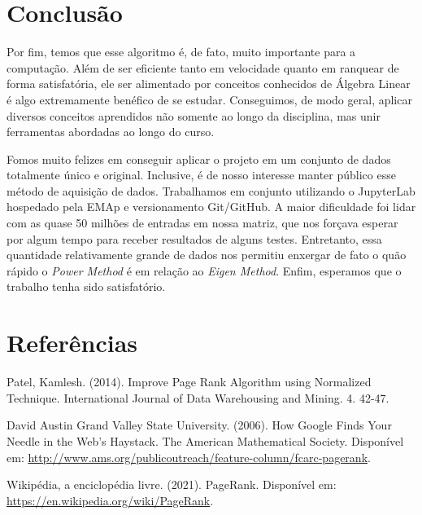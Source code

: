 \documentclass[11pt]{article}
\begin{document}
    \hypertarget{conclusuxe3o}{%
\section{Conclusão}\label{conclusuxe3o}}

Por fim, temos que esse algoritmo é, de fato, muito importante para a
computação. Além de ser eficiente tanto em velocidade quanto em ranquear
de forma satisfatória, ele ser alimentado por conceitos conhecidos de
Álgebra Linear é algo extremamente benéfico de se estudar. Conseguimos,
de modo geral, aplicar diversos conceitos aprendidos não somente ao
longo da disciplina, mas unir ferramentas abordadas ao longo do curso.

Fomos muito felizes em conseguir aplicar o projeto em um conjunto de
dados totalmente único e original. Inclusive, é de nosso interesse
manter público esse método de aquisição de dados. Trabalhamos em
conjunto utilizando o JupyterLab hospedado pela EMAp e versionamento
Git/GitHub. A maior dificuldade foi lidar com as quase 50 milhões de
entradas em nossa matriz, que nos forçava esperar por algum tempo para
receber resultados de alguns testes. Entretanto, essa quantidade
relativamente grande de dados nos permitiu enxergar de fato o quão
rápido o \emph{Power Method} é em relação ao \emph{Eigen Method}. Enfim,
esperamos que o trabalho tenha sido satisfatório.

\hypertarget{referuxeancias}{%
\section*{Referências}\label{referuxeancias}}

Patel, Kamlesh. (2014). Improve Page Rank Algorithm using Normalized
Technique. International Journal of Data Warehousing and Mining. 4.
42-47.

David Austin Grand Valley State University. (2006). How Google Finds
Your Needle in the Web's Haystack. The American Mathematical Society.
Disponível em:
\url{http://www.ams.org/publicoutreach/feature-column/fcarc-pagerank}.

Wikipédia, a enciclopédia livre. (2021). PageRank. Disponível em:
\url{https://en.wikipedia.org/wiki/PageRank}.


    
    
    
\end{document}
